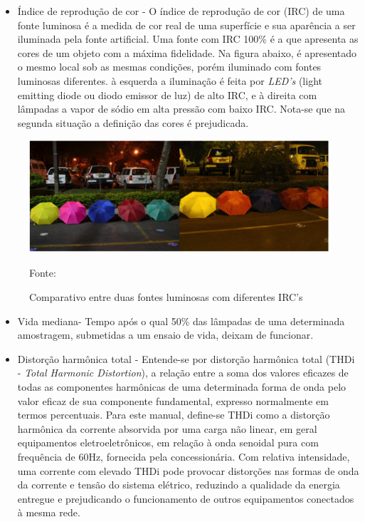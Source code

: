 \begin{itemize}
	\item \'Indice de reprodu\c{c}\~ao de cor - O \'indice de reprodu\c{c}\~ao de cor (IRC) de uma fonte luminosa \'e a medida de cor real de uma superf\'icie e sua apar\^encia a ser iluminada pela fonte artificial. Uma fonte com IRC 100\% \'e a que apresenta as cores de um objeto com a m\'axima fidelidade. Na figura abaixo, \'e apresentado o mesmo local sob as mesmas condi\c{c}\~oes, por\'em iluminado com fontes luminosas diferentes. \`a esquerda a ilumina\c{c}\~ao \'e feita por \textit{LED's} (light emitting diode ou diodo emissor de luz) de alto IRC, e \`a direita com l\^ampadas a vapor de s\'odio em alta press\~ao com baixo IRC. Nota-se que na segunda situa\c{c}\~ao a defini\c{c}\~ao das cores \'e prejudicada.
\end{itemize}

\begin{figure}[H]
	 \centering
	\label{ComparativoDuasFontesLuminosas}
	 \includegraphics[keepaspectratio=true,scale=0.8]{figuras/ComparativoDuasFontesLuminosas.png}
	 \caption{Comparativo entre duas fontes luminosas com diferentes IRC's}
	\small{Fonte: \cite{COPELPARANA} }
\end{figure}

\begin{itemize}
        \item Vida mediana- Tempo ap\'os o qual 50\% das l\^ampadas de uma determinada amostragem, submetidas a um ensaio de vida, deixam de funcionar.
	\item Distor\c{c}\~ao harm\^onica total - Entende-se por distor\c{c}\~ao harm\^onica total (THDi - \textit{Total Harmonic Distortion}), a rela\c{c}\~ao entre a soma dos valores eficazes de todas as componentes harm\^onicas de uma determinada forma de onda pelo valor eficaz de sua componente fundamental, expresso normalmente em termos percentuais. Para este manual, define-se THDi como a distor\c{c}\~ao harm\^onica da corrente absorvida por uma carga n\~ao linear, em geral equipamentos eletroeletr\^onicos, em rela\c{c}\~ao \`a onda senoidal pura com frequ\^encia de 60Hz, fornecida pela concession\'aria. Com relativa intensidade, uma corrente com elevado THDi pode provocar distor\c{c}\~oes nas formas de onda da corrente e tens\~ao do sistema el\'etrico, reduzindo a qualidade da energia entregue e prejudicando o funcionamento de outros equipamentos conectados \`a mesma rede.  \cite{COPELPARANA}
\end{itemize}

